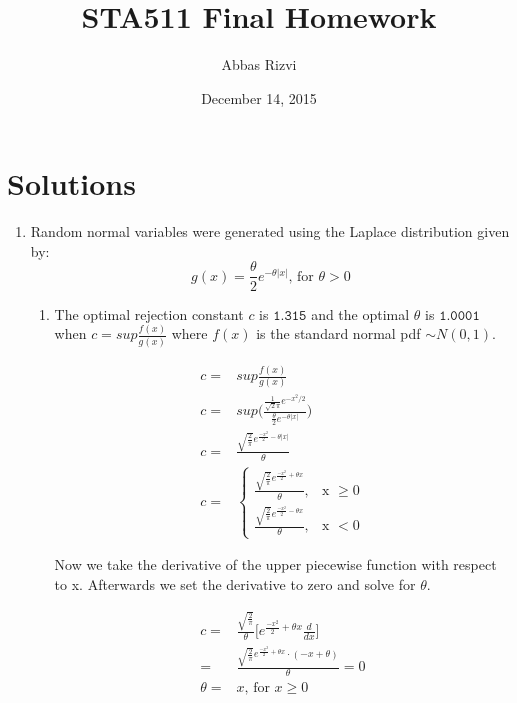 \documentclass[letterpaper]{article}
\begin{document}


\begin{titlepage}
\title{\vspace{30mm}STA511 Final Homework}
\date{December 14, 2015}
\author{Abbas Rizvi}
\clearpage\maketitle
\thispagestyle{empty}
\end{titlepage}

\newpage
\section{Solutions}
\begin{enumerate}
\item Random normal variables were generated using the Laplace distribution given by:
$$g(x) = \frac{\theta}{2}e^{-\theta \vert x \vert} \text{, for } \theta > 0$$
\begin{enumerate}
\item The optimal rejection constant $c$ is $\texttt{1.315}$ and the optimal $\theta$ is $\texttt{1.0001}$ when $c = sup\frac{f(x)}{g(x)}$ where $f(x)$ is the standard normal pdf $\sim N(0,1)$. 

\begin{align*}
c =& sup\frac{f(x)}{g(x)}\\
c =& sup\Bigg(\frac{\frac{1}{\sqrt{2}\pi}e^{-x^{2}/2}}{\frac{\theta}{2}e^{-\theta\vert x \vert}}\Bigg)\\
c =& \frac{\sqrt{\frac{2}{\pi}}e^{\frac{-x^{2}}{2} - \theta \vert x \vert}}{\theta}\\
c =&
\begin{cases}
\frac{\sqrt{\frac{2}{\pi}}e^{\frac{-x^{2}}{2} + \theta x }}{\theta}, & \text{x } \geq 0  \\
\frac{\sqrt{\frac{2}{\pi}}e^{\frac{-x^{2}}{2} - \theta x }}{\theta}, & \text{x } < 0
\end{cases}
\end{align*}

Now we take the derivative of the upper piecewise function with respect to x. Afterwards we set the derivative to zero and solve for $\theta$.


\begin{align*}
c =& \frac{\sqrt{\frac{2}{\pi}}}{\theta} \Bigg[ e^{\frac{-x^{2}}{2} + \theta x} \frac{d}{dx}\Bigg] \\
  =& \frac{\sqrt{\frac{2}{\pi}}e^{\frac{-x^{2}}{2} + \theta x} \cdot (- x + \theta)}{\theta} = 0 \\
  \theta =& x \text{, for } x \geq 0
\end{align*}



\end{enumerate}
\end{enumerate}
\end{document}
